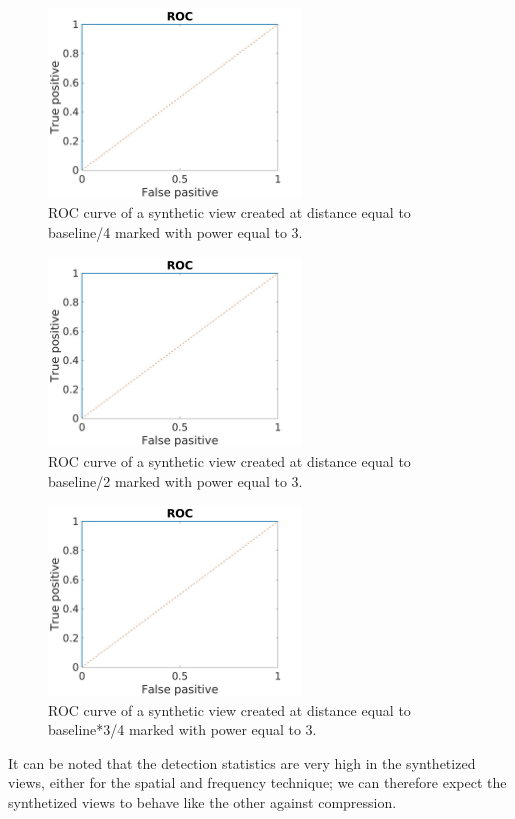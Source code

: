 \begin{figure}[h!]
\centering
\includegraphics[width=0.6\textwidth]{./img/ROC/ROC_gauss_synt_3_25.jpg}
\caption{\small{ROC curve of a synthetic view created at distance equal to baseline/4 marked with power equal to 3. }}
\label{fig:g3vs25}
\end{figure}
\begin{figure}[h!]
\centering
\includegraphics[width=0.6\textwidth]{./img/ROC/ROC_gauss_synt_3_50.jpg}
\caption{\small{ROC curve of a synthetic view created at distance equal to baseline/2 marked with power equal to 3. }}
\label{fig:g3vs50}
\end{figure}
\begin{figure}[h!]
\centering
\includegraphics[width=0.6\textwidth]{./img/ROC/ROC_gauss_synt_3_75.jpg}
\caption{\small{ROC curve of a synthetic view created at distance equal to baseline*3/4 marked with power equal to 3. }}
\label{fig:g3vs75}
\end{figure}
\clearpage
It can be noted that the detection statistics are very high in the synthetized views, either for the spatial and frequency technique; we can therefore expect the synthetized views to behave like the other against compression.\newline

